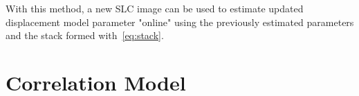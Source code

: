 \documentclass{article}
\begin{document}
With this method, a new SLC image can be used to estimate updated displacement model parameter "online" using the previously estimated parameters and the stack formed with~\autoref{eq:stack}.
\section{Correlation Model}


\end{document}

